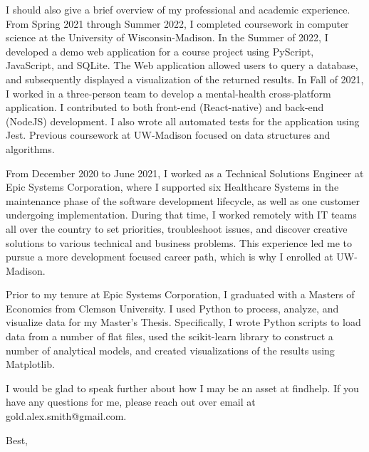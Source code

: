 \documentclass[a4paper, 10pt]{letter}
\begin{document}
\begin{letter}
			I should also give a brief overview of my professional and academic experience. From Spring 2021 through Summer 2022, I completed coursework in computer science at the University of Wisconsin-Madison. In the Summer of 2022, I developed a demo web application for a course project using PyScript, JavaScript, and SQLite. The Web application allowed users to query a database, and subsequently displayed a visualization of the returned results. In Fall of 2021, I worked in a three-person team to develop a mental-health cross-platform application. I contributed to both front-end (React-native) and back-end (NodeJS) development. I also wrote all automated tests for the application using Jest. Previous coursework at UW-Madison focused on data structures and algorithms. 

			From December 2020 to June 2021, I worked as a Technical Solutions Engineer at Epic Systems Corporation, where I supported six Healthcare Systems in the maintenance phase of the software development lifecycle, as well as one customer undergoing implementation. During that time, I worked remotely with IT teams all over the country to set priorities, troubleshoot issues, and discover creative solutions to various technical and business problems. This experience led me to pursue a more development focused career path, which is why I enrolled at UW-Madison.

			Prior to my tenure at Epic Systems Corporation, I graduated with a Masters of Economics from Clemson University. I used Python to process, analyze, and visualize data for my Master’s Thesis. Specifically, I wrote Python scripts to load data from a number of flat files, used the scikit-learn library to construct a number of analytical models, and created visualizations of the results using Matplotlib.

			I would be glad to speak further about how I may be an asset at findhelp. If you have any questions for me, please reach out over email at gold.alex.smith@gmail.com. 
		    \closing{Best,}
		    \end{letter}
		    
\end{document}
